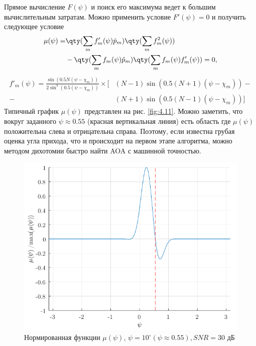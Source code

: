 Прямое вычисление $F(\psi)$ и поиск его максимума ведет к большим вычислительным затратам. Можно применить условие $F'(\psi) =0$ и получить следующее условие
\begin{equation}
    \label{eq:4.31}
    \begin{aligned}
        \mu(\psi) = &
        \qty(\sum\limits_m f'_m(\psi) \hat p_m) \qty(\sum\limits_m f^2_m(\psi))                              \\
                    & - \qty(\sum\limits_m f_m(\psi)\hat p_m) \qty(\sum\limits_m f_m (\psi) f'_m(\psi)) = 0,
    \end{aligned}
\end{equation}
\begin{equation}
    \label{eq:4.32}
    \begin{aligned}
        f'_m(\psi) = \frac{\sin(0.5N (\psi - \chi_m))}{2\sin^3(0.5(\psi - \chi_m))} \times
        \big[
          & (N-1)\sin(0.5(N+1) (\psi - \chi_m)) - \\
        - & (N+1) \sin(0.5(N-1)(\psi - \chi_m))
            \big]
    \end{aligned}
\end{equation}
Типичный график $\mu(\psi)$ представлен на рис. \ref{fig:4.11}. Можно заметить, что вокруг заданного $\psi \approx 0.55$ (красная вертикальная линия) есть область где
$\mu(\psi)$ положительна слева и отрицательна справа. Поэтому, если известна грубая оценка угла прихода,
что и происходит на первом этапе алгоритма,
можно методом дихотомии быстро найти AOA с машинной точностью.
\begin{figure}[ht]
    \centering
    \includegraphics[width=0.75\linewidth]{figs/fig4.11}
    \caption{Нормированная функции $\mu(\psi)$, $\psi=10^{\circ} (\psi \approx 0.55), SNR=30$ дБ}
    \label{fig:4.12}
\end{figure}

